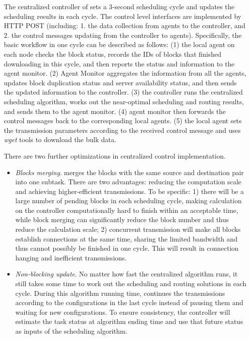 The centralized controller of \name sets a 3-second scheduling cycle and updates the scheduling results in each cycle. The control level interfaces are implemented by HTTP POST (including: 1. the data collection from agents to the controller, and 2. the control messages updating from the controller to agents). Specifically, the basic workflow in one cycle can be described as follows: (1) the local agent on each node checks the block status, records the IDs of blocks that finished downloading in this cycle, and then reports the status and information to the agent monitor. (2) Agent Monitor aggregates the information from all the agents, updates block duplication status and server availability status, and then sends the updated information to the controller. (3) the controller runs the centralized scheduling algorithm, works out the near-optimal scheduling and routing results, and sends them to the agent monitor. (4) agent monitor then forwards the control messages back to the corresponding local agents. (5) the local agent sets the transmission parameters according to the received control message and uses \emph{wget} tools to download the bulk data.

There are two further optimizations in centralized control implementation.
\begin{itemize}
\item \emph{Blocks merging}. \name merges the blocks with the same source and destination pair into one subtask. There are two advantages: reducing the computation scale and achieving higher-efficient transmissions. To be specific: 1) there will be a large number of pending blocks in each scheduling cycle, making calculation on the controller computationally hard to finish within an acceptable time, while block merging can significantly reduce the block number and thus reduce the calculation scale; 2) concurrent transmission will make all blocks establish connections at the same time, sharing the limited bandwidth and thus cannot possibly be finished in one cycle. This will result in connection hanging and inefficient transmissions.
\item \emph{Non-blocking update}. No matter how fast the centralized algorithm runs, it still takes some time to work out the scheduling and routing solutions in each cycle. During this algorithm running time, \name continues the transmissions according to the configurations in the last cycle instead of pausing them and waiting for new configurations. To ensure consistency, the controller will estimate the task status at algorithm ending time and use that future status as inputs of the scheduling algorithm.
\end{itemize}

